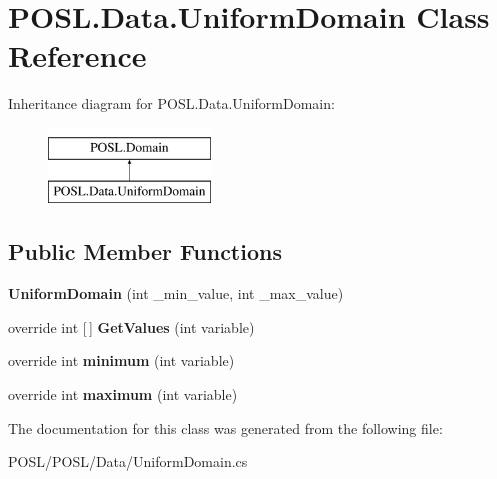 \hypertarget{classPOSL_1_1Data_1_1UniformDomain}{}\section{P\+O\+S\+L.\+Data.\+Uniform\+Domain Class Reference}
\label{classPOSL_1_1Data_1_1UniformDomain}
Inheritance diagram for P\+O\+S\+L.\+Data.\+Uniform\+Domain\+:\begin{figure}[H]
\begin{center}
\leavevmode
\includegraphics[height=2.000000cm]{classPOSL_1_1Data_1_1UniformDomain}
\end{center}
\end{figure}
\subsection*{Public Member Functions}
\begin{DoxyCompactItemize}
\item 
\mbox{\label{classPOSL_1_1Data_1_1UniformDomain_acebfcc9bbe2917eb8f40a3170086e9a8}} 
{\bfseries Uniform\+Domain} (int \+\_\+min\+\_\+value, int \+\_\+max\+\_\+value)
\item 
\mbox{\label{classPOSL_1_1Data_1_1UniformDomain_a0780e19ae2917dbea546cf6517e1c8b7}} 
override int \mbox{[}$\,$\mbox{]} {\bfseries Get\+Values} (int variable)
\item 
\mbox{\label{classPOSL_1_1Data_1_1UniformDomain_acb7a5863ffe580325f012dc04634e42d}} 
override int {\bfseries minimum} (int variable)
\item 
\mbox{\label{classPOSL_1_1Data_1_1UniformDomain_a2e7e493c9fc263247405ae1337cf60ae}} 
override int {\bfseries maximum} (int variable)
\end{DoxyCompactItemize}


The documentation for this class was generated from the following file\+:\begin{DoxyCompactItemize}
\item 
P\+O\+S\+L/\+P\+O\+S\+L/\+Data/Uniform\+Domain.\+cs\end{DoxyCompactItemize}
